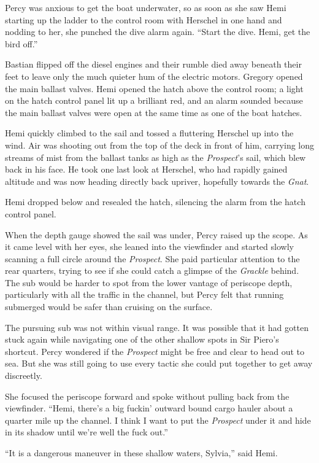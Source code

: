 \documentclass[
]{scrbook}
\begin{document}
Percy was anxious to get the boat underwater, so as soon as she saw Hemi
starting up the ladder to the control room with Herschel in one hand and
nodding to her, she punched the dive alarm again. ``Start the dive.
Hemi, get the bird off.''

Bastian flipped off the diesel engines and their rumble died away
beneath their feet to leave only the much quieter hum of the electric
motors. Gregory opened the main ballast valves. Hemi opened the hatch
above the control room; a light on the hatch control panel lit up a
brilliant red, and an alarm sounded because the main ballast valves were
open at the same time as one of the boat hatches.

Hemi quickly climbed to the sail and tossed a fluttering Herschel up
into the wind. Air was shooting out from the top of the deck in front of
him, carrying long streams of mist from the ballast tanks as high as the
\emph{Prospect}'s sail, which blew back in his face. He took one last
look at Herschel, who had rapidly gained altitude and was now heading
directly back upriver, hopefully towards the \emph{Gnat}.

Hemi dropped below and resealed the hatch, silencing the alarm from the
hatch control panel.

When the depth gauge showed the sail was under, Percy raised up the
scope. As it came level with her eyes, she leaned into the viewfinder
and started slowly scanning a full circle around the \emph{Prospect}.
She paid particular attention to the rear quarters, trying to see if she
could catch a glimpse of the \emph{Grackle} behind. The sub would be
harder to spot from the lower vantage of periscope depth, particularly
with all the traffic in the channel, but Percy felt that running
submerged would be safer than cruising on the surface.

The pursuing sub was not within visual range. It was possible that it
had gotten stuck again while navigating one of the other shallow spots
in Sir Piero's shortcut. Percy wondered if the \emph{Prospect} might be
free and clear to head out to sea. But she was still going to use every
tactic she could put together to get away discreetly.

She focused the periscope forward and spoke without pulling back from
the viewfinder. ``Hemi, there's a big fuckin' outward bound cargo hauler
about a quarter mile up the channel. I think I want to put the
\emph{Prospect} under it and hide in its shadow until we're well the
fuck out.''

``It is a dangerous maneuver in these shallow waters, Sylvia,'' said
Hemi.
\end{document}

